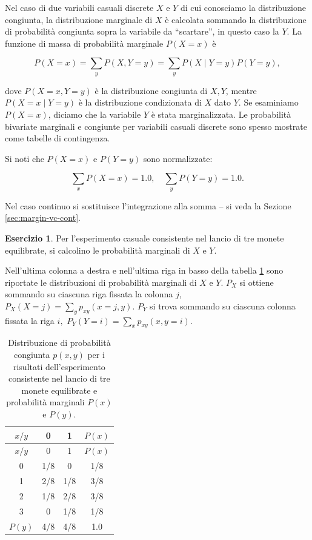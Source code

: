 \documentclass[
  11pt,
]{krantz}
\theoremstyle{definition}
\theoremstyle{definition}
\theoremstyle{definition}
\newtheorem{exercise}{Esercizio}[chapter]
\theoremstyle{definition}
\theoremstyle{remark}
\begin{document}
Nel caso di due variabili casuali discrete \(X\) e \(Y\) di cui conosciamo la distribuzione congiunta, la distribuzione marginale di \(X\) è calcolata sommando la distribuzione di probabilità congiunta sopra la variabile da ``scartare'', in questo caso la \(Y\). La funzione di massa di probabilità marginale \(P(X=x)\) è

\begin{equation}
P(X = x) = \sum_y P(X, Y = y) = \sum_y P(X \mid Y = y) P(Y = y),
\end{equation}

dove \(P(X = x,Y = y)\) è la distribuzione congiunta di \(X, Y\), mentre \(P(X = x \mid Y = y)\) è la distribuzione condizionata di \(X\) dato \(Y\). Se esaminiamo \(P(X=x)\), diciamo che la variabile \(Y\) è stata marginalizzata. Le probabilità bivariate marginali e congiunte per variabili casuali discrete sono spesso mostrate come tabelle di contingenza.

Si noti che \(P(X = x)\) e \(P(Y = y)\) sono normalizzate:

\[
\sum_x P(X=x) = 1.0, \quad \sum_y P(Y=y) = 1.0.
\]

Nel caso continuo si sostituisce l'integrazione alla somma -- si veda la Sezione \ref{sec:margin-vc-cont}.

\begin{exercise}

Per l'esperimento casuale consistente nel lancio di tre monete equilibrate, si calcolino le probabilità marginali di \(X\) e \(Y\).

Nell'ultima colonna a destra e nell'ultima riga in basso della tabella \ref{tab:ditr-cong-biv} sono riportate le distribuzioni di probabilità marginali di \(X\) e \(Y\). \(P_X\) si ottiene sommando su ciascuna riga fissata la colonna \(j\), \(P_X(X = j) = \sum_y p_{xy}(x = j, y)\). \(P_Y\) si trova sommando su ciascuna colonna fissata la riga \(i,\) \(P_Y (Y = i) = \sum_x p_{xy}(x, y = i)\).

\begin{longtable}[]{@{}cccc@{}}
\caption{\label{tab:ditr-cong-biv} Distribuzione di probabilità congiunta \(p(x,y)\) per i risultati dell'esperimento consistente nel lancio di tre monete equilibrate e probabilità marginali \(P(x)\) e \(P(y)\).}\tabularnewline
\toprule
\(x / y\) & 0 & 1 & \(P(x)\) \\
\midrule
\endfirsthead
\toprule
\(x / y\) & 0 & 1 & \(P(x)\) \\
\midrule
\endhead
0 & 1/8 & 0 & 1/8 \\
1 & 2/8 & 1/8 & 3/8 \\
2 & 1/8 & 2/8 & 3/8 \\
3 & 0 & 1/8 & 1/8 \\
\(P(y)\) & 4/8 & 4/8 & 1.0 \\
\bottomrule
\end{longtable}

\end{exercise}
\end{document}
